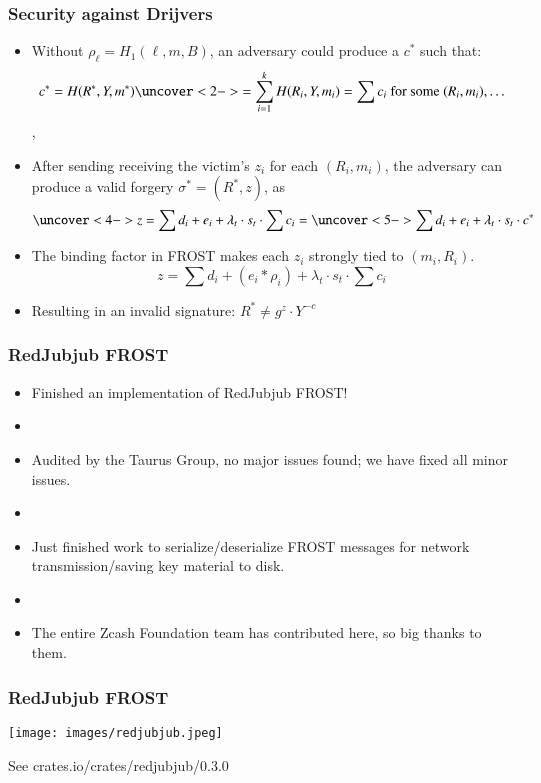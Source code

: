 \documentclass[hyperref={pdfpagelabels=true},table,dvipsnames,14pt,aspectratio=169]{beamer}
\begin{document}
\begin{frame}
  \frametitle{Security against Drijvers}
  \small

  \begin{itemize}
    \item<1->[] Without $\rho_\ell = H_1(\ell, m, B) $,
  an adversary could produce a $c^*$ such that:
      \[ c^*= H(R^*, Y, m^*) \uncover<2->{ = \sum_{i=1}^{k} H(R_i, Y, m_i)  =
      \sum c_i  \text{ for some } (R_i, m_i), \dots } \],
    \item<3->[] After sending receiving the victim's $z_i$ for each $(R_i, m_i)$, the
  adversary can produce a valid forgery $\sigma^*=(R^*, z)$, as
      \[ \uncover<4-> {z = \sum d_i + e_i + \lambda_t \cdot s_t \cdot \sum c_i} = \uncover<5->
      { \sum d_i + e_i + \lambda_t \cdot s_t \cdot c^*} \]
    \item<6->[] The binding factor in FROST makes each $z_i$ strongly tied to
      $(m_i, R_i)$.
      \[ z = \sum d_i + (e_i * \rho_i) + \lambda_t \cdot s_t \cdot \sum c_i  \]
    \item<7->[] Resulting in an invalid signature: $R^* \neq g^z \cdot Y^{-c}$
  \end{itemize}
\end{frame}

\begin{frame}
  \frametitle{RedJubjub FROST}

  \begin{itemize}
    \item<1-> Finished an implementation of RedJubjub FROST!
    \item[]
    \item<2-> Audited by the Taurus Group, no major issues found; we have fixed
      all minor issues.
    \item[]
    \item<3-> Just finished work to serialize/deserialize FROST messages for
      network transmission/saving key material to disk.
    \item[]
    \item<4-> The entire Zcash Foundation team has contributed here, so big thanks to them.
  \end{itemize}
\end{frame}

\begin{frame}
  \frametitle{RedJubjub FROST}
  \centering
  \texttt{[image: images/redjubjub.jpeg]}

  \small
  \medskip
  \medskip
  See crates.io/crates/redjubjub/0.3.0
\end{frame}
\end{document}
